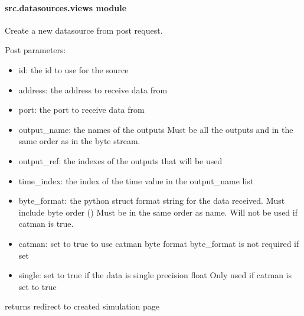 \documentclass[letterpaper,10pt,english]{sphinxmanual}
\begin{document}
\paragraph{src.datasources.views module}
\label{\detokenize{src.datasources:module-src.datasources.views}}\label{\detokenize{src.datasources:src-datasources-views-module}}

\begin{fulllineitems}
\label{\detokenize{src.datasources:src.datasources.views.datasource_create}}
Create a new datasource from post request.

Post parameters:
\begin{itemize}
\item {} 
id: the id to use for the source

\item {} 
address: the address to receive data from

\item {} 
port: the port to receive data from

\item {} 
output\_name: the names of the outputs
Must be all the outputs and in the same order as in the byte stream.

\item {} 
output\_ref: the indexes of the outputs that will be used

\item {} 
time\_index: the index of the time value in the output\_name list

\item {} 
byte\_format: the python struct format string for the data received.
Must include byte order ()
Must be in the same order as name.
Will not be used if catman is true.

\item {} 
catman: set to true to use catman byte format
byte\_format is not required if set

\item {} 
single: set to true if the data is single precision float
Only used if catman is set to true

\end{itemize}

returns redirect to created simulation page

\end{fulllineitems}
\end{document}
